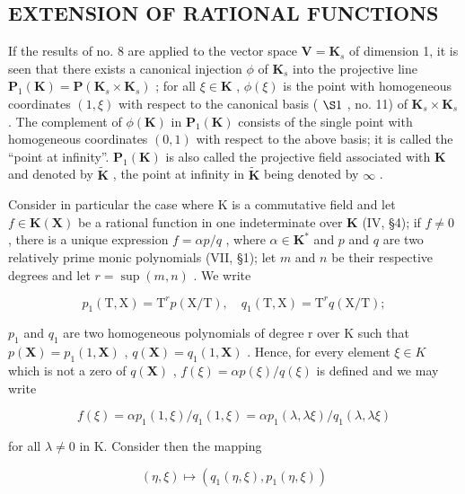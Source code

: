\subsection{EXTENSION OF RATIONAL FUNCTIONS}

If the results of no. 8 are applied to the vector space \(\mathbf{V} = \mathbf{K}_s\) of dimension 1, it is seen that there exists a canonical injection \(\phi\) of \(\mathbf{K}_s\) into the projective line \(\mathbf{P}_1(\mathbf{K}) = \mathbf{P}(\mathbf{K}_s \times \mathbf{K}_s)\) ; for all \(\xi \in \mathbf{K}\) , \(\phi(\xi)\) is the point with homogeneous coordinates \((1, \xi)\) with respect to the canonical basis ( \(\S 1\) , no. 11) of \(\mathbf{K}_s \times \mathbf{K}_s\) . The complement of \(\phi(\mathbf{K})\) in \(\mathbf{P}_1(\mathbf{K})\) consists of the single point with homogeneous coordinates \((0, 1)\) with respect to the above basis; it is called the ``point at infinity''. \(\mathbf{P}_1(\mathbf{K})\) is also called the projective field associated with \(\mathbf{K}\) and denoted by \(\tilde{\mathbf{K}}\) , the point at infinity in \(\tilde{\mathbf{K}}\) being denoted by \(\infty\) .

Consider in particular the case where K is a commutative field and let \(f \in \mathbf{K}(\mathbf{X})\) be a rational function in one indeterminate over \(\mathbf{K}\) (IV, §4); if \(f \neq 0\) , there is a unique expression \(f = \alpha p/q\) , where \(\alpha \in \mathbf{K}^*\) and \(p\) and \(q\) are two relatively prime monic polynomials (VII, §1); let \(m\) and \(n\) be their respective degrees and let \(r = \sup(m, n)\) . We write

\[
p _ {1} (\mathrm{T}, \mathrm{X}) = \mathrm{T} ^ {r} p (\mathrm{X} / \mathrm{T}), \quad q _ {1} (\mathrm{T}, \mathrm{X}) = \mathrm{T} ^ {r} q (\mathrm{X} / \mathrm{T});
\]

\(p_{1}\) and \(q_{1}\) are two homogeneous polynomials of degree r over K such that \(p(\mathbf{X}) = p_{1}(1, \mathbf{X})\) , \(q(\mathbf{X}) = q_{1}(1, \mathbf{X})\) . Hence, for every element \(\xi \in K\) which is not a zero of \(q(\mathbf{X})\) , \(f(\xi) = \alpha p(\xi)/q(\xi)\) is defined and we may write

\[
f (\xi) = \alpha p _ {1} (1, \xi) / q _ {1} (1, \xi) = \alpha p _ {1} (\lambda , \lambda \xi) / q _ {1} (\lambda , \lambda \xi)
\]

for all \(\lambda \neq 0\) in K. Consider then the mapping

\[
(\eta , \xi) \mapsto (q _ {1} (\eta , \xi), p _ {1} (\eta , \xi))
\]

